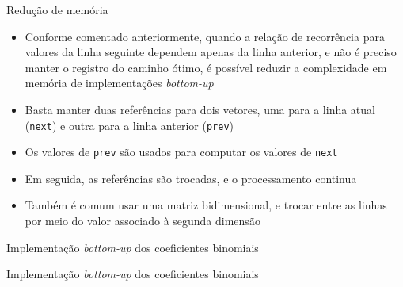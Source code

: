 \begin{frame}[fragile]{Redução de memória}

    \begin{itemize}
        \item Conforme comentado anteriormente, quando a relação de recorrência para valores da
            linha seguinte dependem apenas da linha anterior, e não é preciso manter o registro
            do caminho ótimo, é possível reduzir a complexidade em memória de implementações
           \textit{bottom-up}
        \pause

        \item Basta manter duas referências para dois vetores, uma para a linha atual
            (\texttt{next}) e outra para a linha anterior (\texttt{prev})
        \pause

        \item Os valores de \texttt{prev} são usados para computar os valores de \texttt{next}
        \pause

        \item Em seguida, as referências são trocadas, e o processamento continua
        \pause

        \item Também é comum usar uma matriz bidimensional, e trocar entre as linhas por meio
            do valor associado à segunda dimensão
    \end{itemize}

\end{frame}

\begin{frame}[fragile]{Implementação {\it bottom-up} dos coeficientes binomiais}
\end{frame}

\begin{frame}[fragile]{Implementação {\it bottom-up} dos coeficientes binomiais}
\end{frame}
